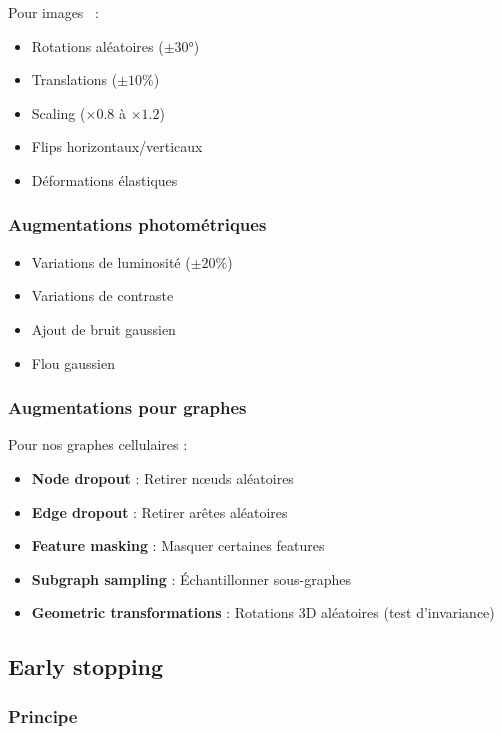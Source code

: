 Pour images~\cite{Shorten2019} :
\begin{itemize}
    \item Rotations aléatoires ($\pm 30°$)
    \item Translations ($\pm 10\%$)
    \item Scaling ($\times 0.8$ à $\times 1.2$)
    \item Flips horizontaux/verticaux
    \item Déformations élastiques
\end{itemize}

\subsubsection{Augmentations photométriques}

\begin{itemize}
    \item Variations de luminosité ($\pm 20\%$)
    \item Variations de contraste
    \item Ajout de bruit gaussien
    \item Flou gaussien
\end{itemize}

\subsubsection{Augmentations pour graphes}

Pour nos graphes cellulaires :
\begin{itemize}
    \item \textbf{Node dropout} : Retirer nœuds aléatoires
    \item \textbf{Edge dropout} : Retirer arêtes aléatoires
    \item \textbf{Feature masking} : Masquer certaines features
    \item \textbf{Subgraph sampling} : Échantillonner sous-graphes
    \item \textbf{Geometric transformations} : Rotations 3D aléatoires (test d'invariance)
\end{itemize}

\subsection{Early stopping}

\subsubsection{Principe}

